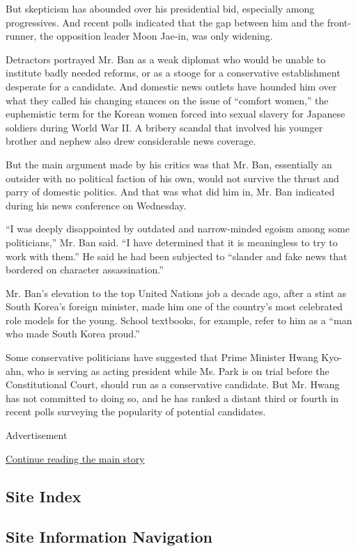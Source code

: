 But skepticism has abounded over his presidential bid, especially among
progressives. And recent polls indicated that the gap between him and
the front-runner, the opposition leader Moon Jae-in, was only widening.

Detractors portrayed Mr. Ban as a weak diplomat who would be unable to
institute badly needed reforms, or as a stooge for a conservative
establishment desperate for a candidate. And domestic news outlets have
hounded him over what they called his changing stances on the issue of
``comfort women,'' the euphemistic term for the Korean women forced into
sexual slavery for Japanese soldiers during World War II. A bribery
scandal that involved his younger brother and nephew also drew
considerable news coverage.

But the main argument made by his critics was that Mr. Ban, essentially
an outsider with no political faction of his own, would not survive the
thrust and parry of domestic politics. And that was what did him in, Mr.
Ban indicated during his news conference on Wednesday.

``I was deeply disappointed by outdated and narrow-minded egoism among
some politicians,'' Mr. Ban said. ``I have determined that it is
meaningless to try to work with them.'' He said he had been subjected to
``slander and fake news that bordered on character assassination.''

Mr. Ban's elevation to the top United Nations job a decade ago, after a
stint as South Korea's foreign minister, made him one of the country's
most celebrated role models for the young. School textbooks, for
example, refer to him as a ``man who made South Korea proud.''

Some conservative politicians have suggested that Prime Minister Hwang
Kyo-ahn, who is serving as acting president while Ms. Park is on trial
before the Constitutional Court, should run as a conservative candidate.
But Mr. Hwang has not committed to doing so, and he has ranked a distant
third or fourth in recent polls surveying the popularity of potential
candidates.

Advertisement

\protect\hyperlink{after-bottom}{Continue reading the main story}

\hypertarget{site-index}{%
\subsection{Site Index}\label{site-index}}

\hypertarget{site-information-navigation}{%
\subsection{Site Information
Navigation}\label{site-information-navigation}}

